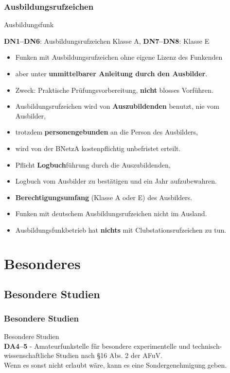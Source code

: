 \begin{frame}
  \frametitle{Ausbildungsrufzeichen}

  {\Large Ausbildungsfunk}

  \textbf{DN1--DN6}: Ausbildungsrufzeichen Klasse A, \textbf{DN7--DN8}: Klasse E

  \begin{itemize}[<+->]
    \item Funken mit Ausbildungsrufzeichen ohne eigene Lizenz des Funkenden
    \item aber unter \textbf{unmittelbarer Anleitung durch den Ausbilder}.
    \item Zweck: Praktische Prüfungsvorbereitung, \textbf{nicht} blosses Vorführen.
    \item Ausbildungsrufzeichen wird von \textbf{Auszubildenden} benutzt, nie vom Ausbilder,
    \item trotzdem \textbf{personengebunden} an die Person des Ausbilders,
    \item wird von der BNetzA kostenpflichtig unbefristet erteilt.
    \item Pflicht \textbf{Logbuch}führung durch die Auszubildenden,
    \item Logbuch vom Ausbilder zu bestätigen und ein Jahr aufzubewahren.
    \item \textbf{Berechtigungsumfang} (Klasse A oder E) des Ausbilders.
    \item Funken mit deutschem Ausbildungsrufzeichen nicht im Ausland.
    \item Ausbildungsfunkbetrieb hat \textbf{nichts} mit Clubstationsrufzeichen zu tun.
  \end{itemize}

\end{frame}

\section{Besonderes}

\subsection{Besondere Studien}

\begin{frame}
  \frametitle{Besondere Studien}

  {\Large Besondere Studien}\\[1.5em]

  \textbf{DA4--5} - Amateurfunkstelle für besondere experimentelle und
  technisch-wissenschaftliche Studien nach §16 Abs. 2 der AFuV.\\[2em]

  Wenn es sonst nicht erlaubt wäre, kann es eine Sondergenehmigung geben.\\[1em]


\end{frame}

